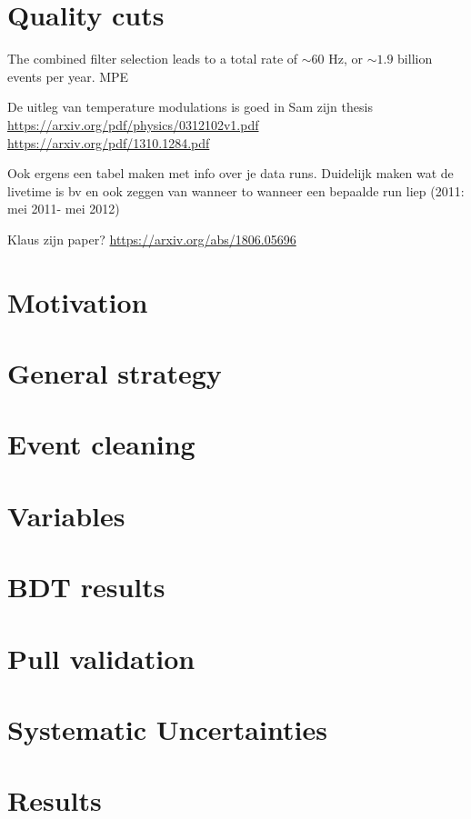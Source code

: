 \section{Quality cuts}
The combined filter selection leads to a total rate of $\sim60$ Hz, or $\sim1.9$ billion events per year. 
MPE 



De uitleg van temperature modulations is goed in Sam zijn thesis
\url{https://arxiv.org/pdf/physics/0312102v1.pdf}\\
\url{https://arxiv.org/pdf/1310.1284.pdf}

Ook ergens een tabel maken met info over je data runs. Duidelijk maken wat de livetime is bv en ook zeggen van wanneer to wanneer een bepaalde run liep (2011: mei 2011- mei 2012)

Klaus zijn paper? \url{https://arxiv.org/abs/1806.05696}

\section{Motivation}
\section{General strategy}
\section{Event cleaning}
\section{Variables}
\section{BDT results}
\section{Pull validation}
\section{Systematic Uncertainties}

\section{Results}